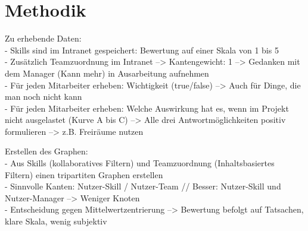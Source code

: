 \chapter{Methodik}
\label{ch:methodik}

Zu erhebende Daten:\\
- Skills sind im Intranet gespeichert: Bewertung auf einer Skala von 1 bis 5\\
- Zusätzlich Teamzuordnung im Intranet --> Kantengewicht: 1 --> Gedanken mit dem Manager (Kann mehr) in Ausarbeitung aufnehmen\\
- Für jeden Mitarbeiter erheben: Wichtigkeit (true/false) --> Auch für Dinge, die man noch nicht kann\\
- Für jeden Mitarbeiter erheben: Welche Auswirkung hat es, wenn im Projekt nicht ausgelastet (Kurve A bis C) --> Alle drei Antwortmöglichkeiten positiv formulieren --> z.B. Freiräume nutzen

Erstellen des Graphen:\\
- Aus Skills (kollaboratives Filtern) und Teamzuordnung (Inhaltsbasiertes Filtern) einen tripartiten Graphen erstellen\\
- Sinnvolle Kanten: Nutzer-Skill / Nutzer-Team // Besser: Nutzer-Skill und Nutzer-Manager --> Weniger Knoten\\
- Entscheidung gegen Mittelwertzentrierung --> Bewertung befolgt auf Tatsachen, klare Skala, wenig subjektiv

